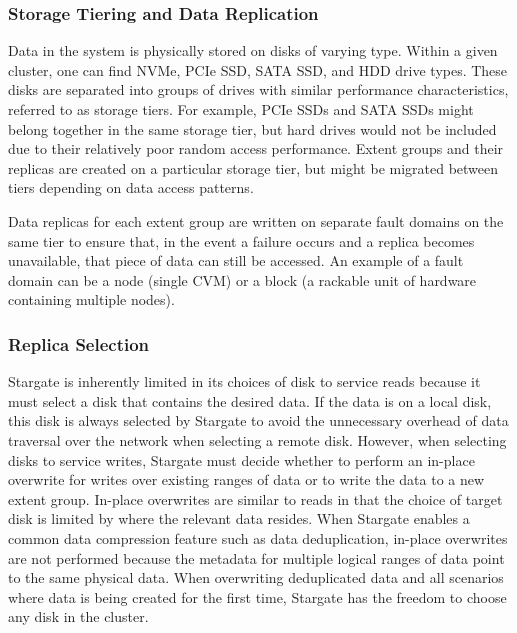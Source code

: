 \documentclass[12pt]{article}
\begin{document}
    \subsubsection{Storage Tiering and Data Replication}

    Data in the system is physically stored on disks of varying type. Within a
    given cluster, one can find NVMe, PCIe SSD, SATA SSD, and HDD drive types.
    These disks are separated into groups of drives with similar performance
    characteristics, referred to as storage tiers. For example, PCIe SSDs and
    SATA SSDs might belong together in the same storage tier, but hard drives
    would not be included due to their relatively poor random access
    performance. Extent groups and their replicas are created on a particular
    storage tier, but might be migrated between tiers depending on data access
    patterns.

    Data replicas for each extent group are written on separate fault domains
    on the same tier to ensure that, in the event a failure occurs and a
    replica becomes unavailable, that piece of data can still be accessed. An
    example of a fault domain can be a node (single CVM) or a block (a rackable
    unit of hardware containing multiple nodes). 

    \subsubsection{Replica Selection} \label{sec:replica-selection}

    Stargate is inherently limited in its choices of disk to service reads
    because it must select a disk that contains the desired data. If the data is
    on a local disk, this disk is always selected by Stargate to avoid the
    unnecessary overhead of data traversal over the network when selecting a
    remote disk.  However, when selecting disks to service writes, Stargate
    must decide whether to perform an in-place overwrite for writes over
    existing ranges of data or to write the data to a new extent group.
    In-place overwrites are similar to reads in that the choice of target disk
    is limited by where the relevant data resides. When Stargate enables a
    common data compression feature such as data deduplication, in-place
    overwrites are not performed because the metadata for multiple logical ranges
    of data point to the same physical data. When overwriting deduplicated data
    and all scenarios where data is being created for the first time, Stargate
    has the freedom to choose any disk in the cluster.
\end{document}
